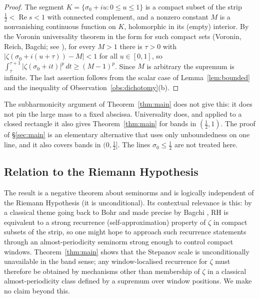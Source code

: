 \documentclass[11pt]{amsart}
\theoremstyle{definition}
\theoremstyle{remark}
\DeclareMathOperator{\Real}{Re}
\begin{document}
\begin{proof}
The segment $K=\{\sigma_0+iu:0\le u\le1\}$ is a compact subset of the
strip $\tfrac12<\Real s<1$ with connected complement, and a nonzero
constant $M$ is a nonvanishing continuous function on $K$, holomorphic
in its (empty) interior. By the Voronin universality theorem in the
form for such compact sets (Voronin, Reich, Bagchi; see
\cite[Ch.~1]{Steuding}), for every $M>1$ there is $\tau>0$ with
$|\zeta(\sigma_0+i(u+\tau))-M|<1$ for all $u\in[0,1]$, so
$\int_\tau^{\tau+1}|\zeta(\sigma_0+it)|^p\,dt\ge(M-1)^p$. Since $M$ is
arbitrary the supremum is infinite. The last assertion follows from the
scalar case of Lemma~\ref{lem:bounded} and the inequality of
Observation~\ref{obs:dichotomy}(b).
\end{proof}

The subharmonicity argument of Theorem~\ref{thm:main} does not give
this: it does not pin the large mass to a fixed abscissa. Universality
does, and applied to a closed rectangle it also gives
Theorem~\ref{thm:main} for bands in $(\tfrac12,1)$. The proof of
\S\ref{sec:main} is an elementary alternative that uses only
unboundedness on one line, and it also covers bands in $(0,\tfrac12]$.
The lines $\sigma_0\le\tfrac12$ are not treated here.

\subsection{Relation to the Riemann Hypothesis}
The result is a negative theorem about seminorms and is logically
independent of the Riemann Hypothesis (it is unconditional). Its
contextual relevance is this: by a classical theme going back to
Bohr \cite{Bohr22} and made precise by Bagchi \cite{Bagchi}, RH is
equivalent to a strong recurrence (self-approximation) property of
$\zeta$ in compact subsets of the strip, so one might hope to approach
such recurrence statements through an almost-periodicity seminorm
strong enough to control compact windows. Theorem~\ref{thm:main} shows
that the Stepanov scale is unconditionally unavailable in the band sense; any
window-localised recurrence for $\zeta$ must therefore be obtained by
mechanisms other than membership of $\zeta$ in a classical
almost-periodicity class defined by a supremum over window
positions. We make no claim beyond
this.
\end{document}
